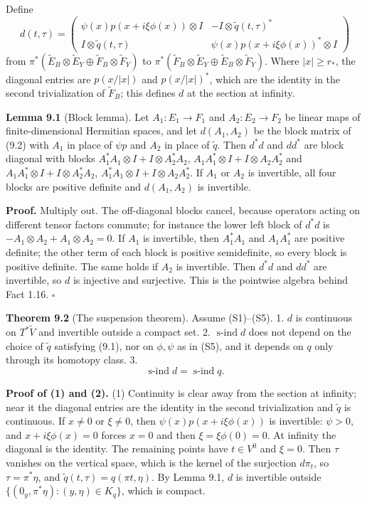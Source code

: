 \documentclass[
  11pt,
]{article}
\begin{document}
Define \[
d(t,\tau)=\begin{pmatrix}\psi(x)p(x+i\xi\phi(x))\otimes I&-I\otimes\tilde q(t,\tau)^*\\ I\otimes\tilde q(t,\tau)&\psi(x)p(x+i\xi\phi(x))^*\otimes I\end{pmatrix}
\tag{9.2}
\] from
\(\pi^*(\tilde E_B\otimes\tilde E_Y\oplus\tilde F_B\otimes\tilde F_Y)\)
to
\(\pi^*(\tilde F_B\otimes\tilde E_Y\oplus\tilde E_B\otimes\tilde F_Y)\).
Where \(|x|\ge r_*\), the diagonal entries are \(p(x/|x|)\) and
\(p(x/|x|)^*\), which are the identity in the second trivialization of
\(\tilde F_B\); this defines \(d\) at the section at infinity.

\textbf{Lemma 9.1} (Block lemma). Let \(A_1:E_1\to F_1\) and
\(A_2:E_2\to F_2\) be linear maps of finite-dimensional Hermitian
spaces, and let \(d(A_1,A_2)\) be the block matrix of (9.2) with \(A_1\)
in place of \(\psi p\) and \(A_2\) in place of \(\tilde q\). Then
\(d^*d\) and \(dd^*\) are block diagonal with blocks
\(A_1^*A_1\otimes I+I\otimes A_2^*A_2\),
\(A_1A_1^*\otimes I+I\otimes A_2A_2^*\) and
\(A_1A_1^*\otimes I+I\otimes A_2^*A_2\),
\(A_1^*A_1\otimes I+I\otimes A_2A_2^*\). If \(A_1\) or \(A_2\) is
invertible, all four blocks are positive definite and \(d(A_1,A_2)\) is
invertible.

\textbf{Proof.} Multiply out. The off-diagonal blocks cancel, because
operators acting on different tensor factors commute; for instance the
lower left block of \(d^*d\) is \(-A_1\otimes A_2+A_1\otimes A_2=0\). If
\(A_1\) is invertible, then \(A_1^*A_1\) and \(A_1A_1^*\) are positive
definite; the other term of each block is positive semidefinite, so
every block is positive definite. The same holds if \(A_2\) is
invertible. Then \(d^*d\) and \(dd^*\) are invertible, so \(d\) is
injective and surjective. This is the pointwise algebra behind Fact
1.16. \(\square\)

\textbf{Theorem 9.2} (The suspension theorem). Assume (S1)--(S5). 1.
\(d\) is continuous on \(T^*\tilde V\) and invertible outside a compact
set. 2. \(\operatorname{s-ind}d\) does not depend on the choice of
\(\tilde q\) satisfying (9.1), nor on \(\phi,\psi\) as in (S5), and it
depends on \(q\) only through its homotopy class. 3. \[
\operatorname{s-ind}d=\operatorname{s-ind}q .
\tag{9.3}
\]

\textbf{Proof of (1) and (2).} (1) Continuity is clear away from the
section at infinity; near it the diagonal entries are the identity in
the second trivialization and \(\tilde q\) is continuous. If \(x\ne0\)
or \(\xi\ne0\), then \(\psi(x)p(x+i\xi\phi(x))\) is invertible:
\(\psi>0\), and \(x+i\xi\phi(x)=0\) forces \(x=0\) and then
\(\xi=\xi\phi(0)=0\). At infinity the diagonal is the identity. The
remaining points have \(t\in V^0\) and \(\xi=0\). Then \(\tau\) vanishes
on the vertical space, which is the kernel of the surjection \(d\pi_t\),
so \(\tau=\pi^*\eta\), and \(\tilde q(t,\tau)=q(\pi t,\eta)\). By Lemma
9.1, \(d\) is invertible outside
\(\{(0_y,\pi^*\eta):(y,\eta)\in K_q\}\), which is compact.
\end{document}
